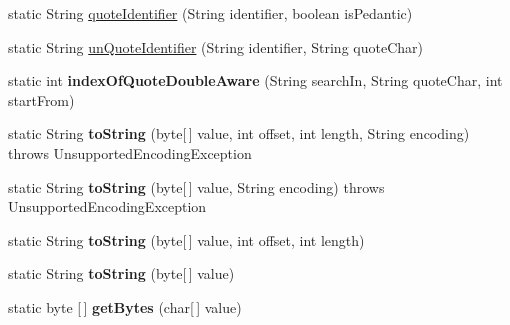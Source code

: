 \begin{DoxyCompactItemize}
static String \mbox{\hyperlink{classcom_1_1mysql_1_1jdbc_1_1_string_utils_a7ecf14188b41e974d586d79f3295d4f1}{quote\+Identifier}} (String identifier, boolean is\+Pedantic)
\item 
static String \mbox{\hyperlink{classcom_1_1mysql_1_1jdbc_1_1_string_utils_a2b5fec0251d326e70298ce197422e5cc}{un\+Quote\+Identifier}} (String identifier, String quote\+Char)
\item 
\mbox{\label{classcom_1_1mysql_1_1jdbc_1_1_string_utils_a7eb0300beb295c2b8b102a2027f86c09}} 
static int {\bfseries index\+Of\+Quote\+Double\+Aware} (String search\+In, String quote\+Char, int start\+From)
\item 
\mbox{\label{classcom_1_1mysql_1_1jdbc_1_1_string_utils_a9d2d56cb783cadc8fcc5326dbdde2f94}} 
static String {\bfseries to\+String} (byte\mbox{[}$\,$\mbox{]} value, int offset, int length, String encoding)  throws Unsupported\+Encoding\+Exception 
\item 
\mbox{\label{classcom_1_1mysql_1_1jdbc_1_1_string_utils_ad4c10768cc1cd8bd40f6592fae012763}} 
static String {\bfseries to\+String} (byte\mbox{[}$\,$\mbox{]} value, String encoding)  throws Unsupported\+Encoding\+Exception 
\item 
\mbox{\label{classcom_1_1mysql_1_1jdbc_1_1_string_utils_abfed3bf99b160fa25001528c19399e09}} 
static String {\bfseries to\+String} (byte\mbox{[}$\,$\mbox{]} value, int offset, int length)
\item 
\mbox{\label{classcom_1_1mysql_1_1jdbc_1_1_string_utils_a1926d826a1da992214af8028c67215da}} 
static String {\bfseries to\+String} (byte\mbox{[}$\,$\mbox{]} value)
\item 
\mbox{\label{classcom_1_1mysql_1_1jdbc_1_1_string_utils_af78c2272f5a4b6499a24809d88452b18}} 
static byte \mbox{[}$\,$\mbox{]} {\bfseries get\+Bytes} (char\mbox{[}$\,$\mbox{]} value)
\item 
\mbox{\label{classcom_1_1mysql_1_1jdbc_1_1_string_utils_a2631f6d78e753a4edb52d6bdc09256bd}} 

\end{DoxyCompactItemize}

